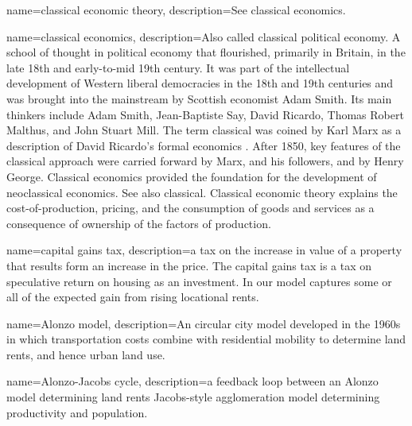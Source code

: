 {
name=classical economic theory,
description={See \gls{classical economics}.}
}


{
name=classical economics,
description={Also called classical \gls{political economy}. %
A school of thought in political economy that flourished, primarily in Britain, in the late 18th and early-to-mid 19th century. It was part of the intellectual development of  Western liberal democracies in the 18th and 19th centuries and was brought into the mainstream by Scottish economist Adam Smith. Its main thinkers include Adam Smith, Jean-Baptiste Say, David Ricardo, Thomas Robert Malthus, and John Stuart Mill.  The term classical was coined by Karl Marx %
as a description of David Ricardo's formal economics \cite{colanderDeathNeoclassicalEconomics2000}. After 1850, key features of the classical approach were carried forward by Marx, and his followers, and by Henry George. Classical economics provided the foundation for the development of \gls{neoclassical economics}. See also \gls{classical}.  Classical economic theory explains the cost-of-production, pricing, and the consumption of goods and services as a consequence of ownership of the factors of production.}
}


{
name=capital gains tax,
description={a tax on the increase in value of a property that results form an increase in the price. The capital gains tax is a tax on speculative return on housing as an investment. In our model captures some or all of the expected gain from rising locational rents.}
}

{
name=Alonzo model,
description={An circular city model developed in the 1960s in which transportation costs combine with residential mobility to determine land rents, and hence urban land use.}
}

{
name=Alonzo-Jacobs cycle,
description={a feedback loop between an \Gls{Alonzo model} determining land rents Jacobs-style \gls{agglomeration} model determining productivity and population.}
}

